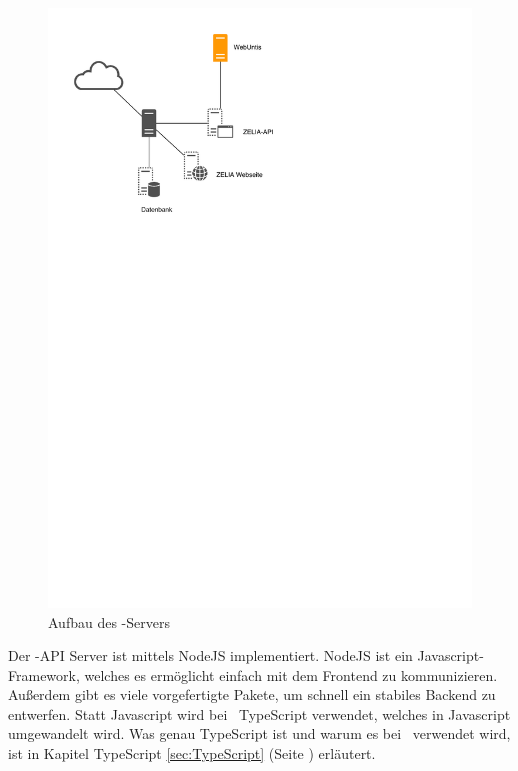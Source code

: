 \begin{figure}[H]
    \centering
    \includegraphics[width=120mm]{./media/Intro/server_arch.svg.pdf}
    \caption{Aufbau des \ZELIA-Servers}
    \label{fig:server_arch}
\end{figure}

Der \ZELIA-API Server ist mittels NodeJS implementiert. NodeJS ist ein Javascript-Framework, welches es ermöglicht einfach mit dem Frontend zu kommunizieren. Außerdem gibt es viele vorgefertigte Pakete, um schnell ein stabiles Backend zu entwerfen. Statt Javascript wird bei \ZELIA\  TypeScript verwendet, welches in Javascript umgewandelt wird. Was genau TypeScript ist und warum es bei \ZELIA\ verwendet wird, ist in Kapitel TypeScript \ref{sec:TypeScript} (Seite \pageref{sec:TypeScript}) erläutert.


